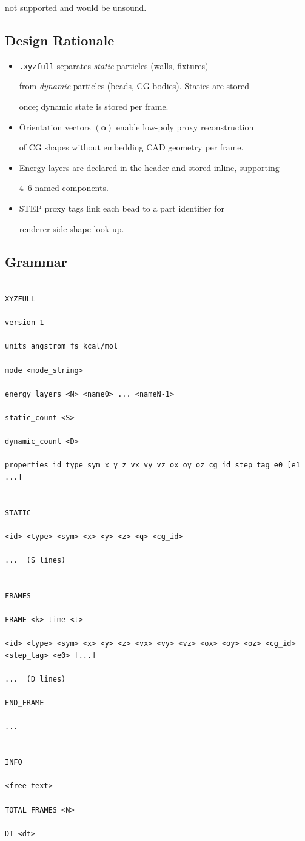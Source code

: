 \documentclass[12pt, a4paper, oneside]{article}
\begin{document}
not supported and would be unsound.


\subsection{Design Rationale}


\begin{itemize}

  \item \texttt{.xyzfull} separates \emph{static} particles (walls, fixtures)

        from \emph{dynamic} particles (beads, CG bodies).  Statics are stored

        once; dynamic state is stored per frame.

  \item Orientation vectors $(\mathbf{o})$ enable low-poly proxy reconstruction

        of CG shapes without embedding CAD geometry per frame.

  \item Energy layers are declared in the header and stored inline, supporting

        4--6 named components.

  \item STEP proxy tags link each bead to a part identifier for

        renderer-side shape look-up.

\end{itemize}


\subsection{Grammar}


\begin{lstlisting}[language={},frame=single]

XYZFULL

version 1

units angstrom fs kcal/mol

mode <mode_string>

energy_layers <N> <name0> ... <nameN-1>

static_count <S>

dynamic_count <D>

properties id type sym x y z vx vy vz ox oy oz cg_id step_tag e0 [e1 ...]


STATIC

<id> <type> <sym> <x> <y> <z> <q> <cg_id>

...  (S lines)


FRAMES

FRAME <k> time <t>

<id> <type> <sym> <x> <y> <z> <vx> <vy> <vz> <ox> <oy> <oz> <cg_id> <step_tag> <e0> [...]

...  (D lines)

END_FRAME

...


INFO

<free text>

TOTAL_FRAMES <N>

DT <dt>

\end{lstlisting}
\end{document}
